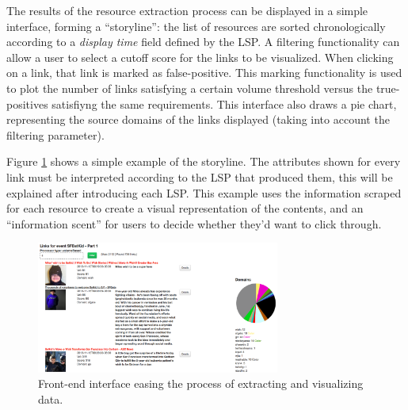 \documentclass{sig-alternate}
\begin{document}
The results of the resource extraction process can be displayed in a simple interface, forming a ``storyline'': the list of resources are sorted chronologically according to a \emph{display time} field defined by the LSP. A filtering functionality can allow a user to select a cutoff score for the links to be visualized. When clicking on a link, that link is marked as false-positive. This marking functionality is used to plot the number of links satisfying a certain volume threshold versus the true-positives satisfiyng the same requirements. This interface also draws a pie chart, representing the source domains of the links displayed (taking into account the filtering parameter).

Figure \ref{fig:javascript_interface} shows a simple example of the storyline. The attributes shown for every link must be interpreted according to the LSP that produced them, this will be explained after introducing each LSP. This example uses the information scraped for each resource to create a visual representation of the contents, and an ``information scent'' for users to decide whether they'd want to click through. %
\begin{figure}[htbp]
  \centering
  \includegraphics[width=8cm]{Figures/javascript_interface.png}
  \caption{Front-end interface easing the process of extracting and visualizing data.}
  \label{fig:javascript_interface}
\end{figure}

\end{document}
